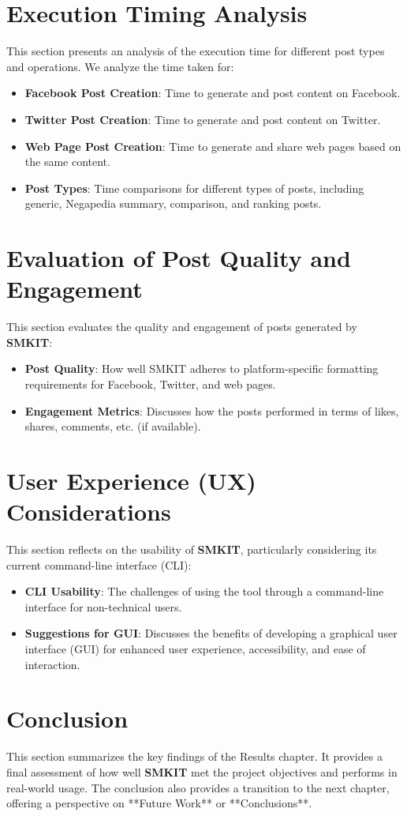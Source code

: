 \section{Execution Timing Analysis}
\label{sec:execution_timing}
This section presents an analysis of the execution time for different post types and operations. We analyze the time taken for:
\begin{itemize}
    \item \textbf{Facebook Post Creation}: Time to generate and post content on Facebook.
    \item \textbf{Twitter Post Creation}: Time to generate and post content on Twitter.
    \item \textbf{Web Page Post Creation}: Time to generate and share web pages based on the same content.
    \item \textbf{Post Types}: Time comparisons for different types of posts, including generic, Negapedia summary, comparison, and ranking posts.
\end{itemize}


\section{Evaluation of Post Quality and Engagement}
\label{sec:evaluation_post_quality}
This section evaluates the quality and engagement of posts generated by \textbf{SMKIT}:
\begin{itemize}
    \item \textbf{Post Quality}: How well SMKIT adheres to platform-specific formatting requirements for Facebook, Twitter, and web pages.
    \item \textbf{Engagement Metrics}: Discusses how the posts performed in terms of likes, shares, comments, etc. (if available).
\end{itemize}


\section{User Experience (UX) Considerations}
\label{sec:user_experience}
This section reflects on the usability of \textbf{SMKIT}, particularly considering its current command-line interface (CLI):
\begin{itemize}
    \item \textbf{CLI Usability}: The challenges of using the tool through a command-line interface for non-technical users.
    \item \textbf{Suggestions for GUI}: Discusses the benefits of developing a graphical user interface (GUI) for enhanced user experience, accessibility, and ease of interaction.
\end{itemize}


\section{Conclusion}
\label{sec:results_conclusion}
This section summarizes the key findings of the Results chapter. It provides a final assessment of how well \textbf{SMKIT} met the project objectives and performs in real-world usage. The conclusion also provides a transition to the next chapter, offering a perspective on **Future Work** or **Conclusions**.
